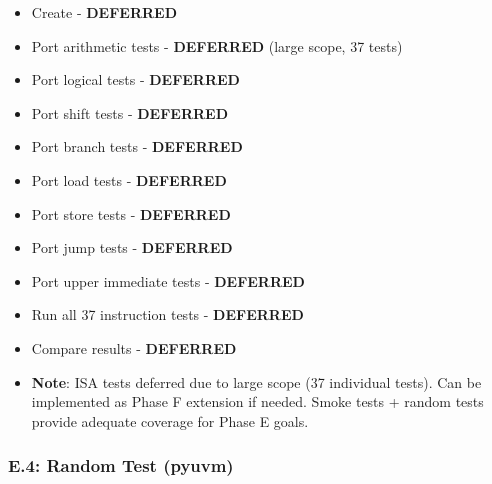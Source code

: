 \begin{record}

\begin{itemize}
\tightlist
\item[$\square$]
  Create  - \textbf{DEFERRED}
\item[$\square$]
  Port arithmetic tests - \textbf{DEFERRED} (large scope, 37 tests)
\item[$\square$]
  Port logical tests - \textbf{DEFERRED}
\item[$\square$]
  Port shift tests - \textbf{DEFERRED}
\item[$\square$]
  Port branch tests - \textbf{DEFERRED}
\item[$\square$]
  Port load tests - \textbf{DEFERRED}
\item[$\square$]
  Port store tests - \textbf{DEFERRED}
\item[$\square$]
  Port jump tests - \textbf{DEFERRED}
\item[$\square$]
  Port upper immediate tests - \textbf{DEFERRED}
\item[$\square$]
  Run all 37 instruction tests - \textbf{DEFERRED}
\item[$\square$]
  Compare results - \textbf{DEFERRED}
\end{itemize}

\begin{itemize}
\tightlist
\item
  \textbf{Note}: ISA tests deferred due to large scope (37 individual
  tests). Can be implemented as Phase F extension if needed. Smoke tests
  + random tests provide adequate coverage for Phase E goals.
\end{itemize}

\end{record}

\subsubsection{E.4: Random Test (pyuvm)}\label{cr:status:pyuvm-migration:e4-random-test-pyuvm}

